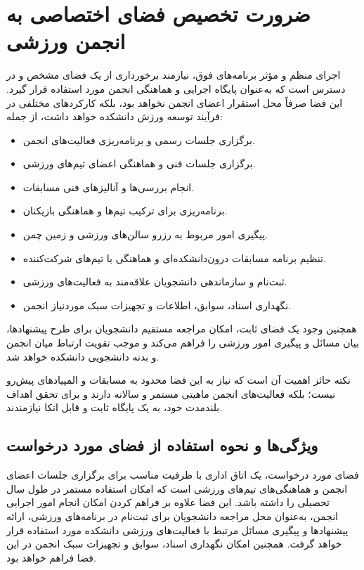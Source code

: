 \documentclass[12pt,a4paper]{article}
\begin{document}
\section{ضرورت تخصیص فضای اختصاصی به انجمن ورزشی}
اجرای منظم و مؤثر برنامه‌های فوق، نیازمند برخورداری از یک فضای مشخص و در دسترس است که به‌عنوان پایگاه اجرایی و هماهنگی انجمن مورد استفاده قرار گیرد. این فضا صرفاً محل استقرار اعضای انجمن نخواهد بود، بلکه کارکردهای مختلفی در فرآیند توسعه ورزش دانشکده خواهد داشت، از جمله:
\begin{itemize}
    \item برگزاری جلسات رسمی و برنامه‌ریزی فعالیت‌های انجمن.
    \item برگزاری جلسات فنی و هماهنگی اعضای تیم‌های ورزشی.
    \item انجام بررسی‌ها و آنالیزهای فنی مسابقات.
    \item برنامه‌ریزی برای ترکیب تیم‌ها و هماهنگی بازیکنان.
    \item پیگیری امور مربوط به رزرو سالن‌های ورزشی و زمین چمن.
    \item تنظیم برنامه مسابقات درون‌دانشکده‌ای و هماهنگی با تیم‌های شرکت‌کننده.
    \item ثبت‌نام و سازماندهی دانشجویان علاقه‌مند به فعالیت‌های ورزشی.
    \item نگهداری اسناد، سوابق، اطلاعات و تجهیزات سبک موردنیاز انجمن.
\end{itemize}
همچنین وجود یک فضای ثابت، امکان مراجعه مستقیم دانشجویان برای طرح پیشنهادها، بیان مسائل و پیگیری امور ورزشی را فراهم می‌کند و موجب تقویت ارتباط میان انجمن و بدنه دانشجویی دانشکده خواهد شد.

نکته حائز اهمیت آن است که نیاز به این فضا محدود به مسابقات و المپیادهای پیش‌رو نیست؛ بلکه فعالیت‌های انجمن ماهیتی مستمر و سالانه دارند و برای تحقق اهداف بلندمدت خود، به یک پایگاه ثابت و قابل اتکا نیازمندند.

\subsection*{ویژگی‌ها و نحوه استفاده از فضای مورد درخواست}
فضای مورد درخواست، یک اتاق اداری با ظرفیت مناسب برای برگزاری جلسات اعضای انجمن و هماهنگی‌های تیم‌های ورزشی است که امکان استفاده مستمر در طول سال تحصیلی را داشته باشد. این فضا علاوه بر فراهم کردن امکان انجام امور اجرایی انجمن، به‌عنوان محل مراجعه دانشجویان برای ثبت‌نام در برنامه‌های ورزشی، ارائه پیشنهادها و پیگیری مسائل مرتبط با فعالیت‌های ورزشی دانشکده مورد استفاده قرار خواهد گرفت. همچنین امکان نگهداری اسناد، سوابق و تجهیزات سبک انجمن در این فضا فراهم خواهد بود.
\end{document}
